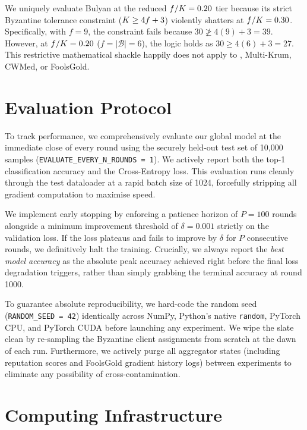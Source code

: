 \documentclass[../main.tex]{subfiles}
\begin{document}
We uniquely evaluate Bulyan at the reduced $f/K = 0.20$ tier because its strict Byzantine tolerance constraint ($K \geq 4f + 3$) violently shatters at $f/K = 0.30$. Specifically, with $f = 9$, the constraint fails because $30 \ngeq 4(9) + 3 = 39$. However, at $f/K = 0.20$ ($f = |\mathcal{B}| = 6$), the logic holds as $30 \geq 4(6) + 3 = 27$. This restrictive mathematical shackle happily does not apply to \aegis{}, Multi-Krum, CWMed, or FoolsGold.

\section{Evaluation Protocol}
\label{sec:exp_eval}

To track performance, we comprehensively evaluate our global model at the immediate close of every round using the securely held-out test set of 10,000 samples (\texttt{EVALUATE\_EVERY\_N\_ROUNDS = 1}). We actively report both the top-1 classification accuracy and the Cross-Entropy loss. This evaluation runs cleanly through the test dataloader at a rapid batch size of 1024, forcefully stripping all gradient computation to maximise speed.

We implement early stopping by enforcing a patience horizon of $P = 100$ rounds alongside a minimum improvement threshold of $\delta = 0.001$ strictly on the validation loss. If the loss plateaus and fails to improve by $\delta$ for $P$ consecutive rounds, we definitively halt the training. Crucially, we always report the \emph{best model accuracy} as the absolute peak accuracy achieved right before the final loss degradation triggers, rather than simply grabbing the terminal accuracy at round 1000.

To guarantee absolute reproducibility, we hard-code the random seed (\texttt{RANDOM\_SEED = 42}) identically across NumPy, Python's native \texttt{random}, PyTorch CPU, and PyTorch CUDA before launching any experiment. We wipe the slate clean by re-sampling the Byzantine client assignments from scratch at the dawn of each run. Furthermore, we actively purge all aggregator states (including \aegis{} reputation scores and FoolsGold gradient history logs) between experiments to eliminate any possibility of cross-contamination.

\section{Computing Infrastructure}
\label{sec:exp_infrastructure}
\end{document}
